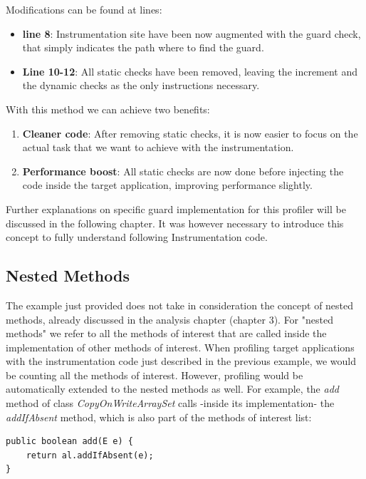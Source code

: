 \documentclass[]{usiinfthesis}
\begin{document}
\vspace*{0.5cm}

\noindent
Modifications can be found at lines:
\begin{itemize}
    \item \textbf{line 8}: Instrumentation site have been now augmented with the guard check, that simply indicates the path where to find the guard.
    
    \item \textbf{Line 10-12}: All static checks have been removed, leaving the increment and the dynamic checks as the only instructions necessary.
\end{itemize}

\noindent
With this method we can achieve two benefits:
\begin{enumerate}
    \item \textbf{Cleaner code}: After removing static checks, it is now easier to focus on the actual task that we want to achieve with the instrumentation.
    
    \item \textbf{Performance boost}: All static checks are now done before injecting the code inside the target application, improving performance slightly.
\end{enumerate}

\noindent
Further explanations on specific guard implementation for this profiler will be discussed in the following chapter. It was however necessary to introduce this concept to fully understand following Instrumentation code.

\subsection{Nested Methods}
The example just provided does not take in consideration the concept of nested methods, already discussed in the analysis chapter (chapter 3). For "nested methods" we refer to all the methods of interest that are called inside the implementation of other methods of interest. When profiling target applications with the instrumentation code just described in the previous example, we would be counting all the methods of interest. However, profiling would be automatically extended to the nested methods as well. For example, the \textit{add} method of class \textit{CopyOnWriteArraySet} calls -inside its implementation- the \textit{addIfAbsent} method, which is also part of the methods of interest list:

\begin{verbatim}
public boolean add(E e) {
    return al.addIfAbsent(e);
}
\end{verbatim}
\end{document}
